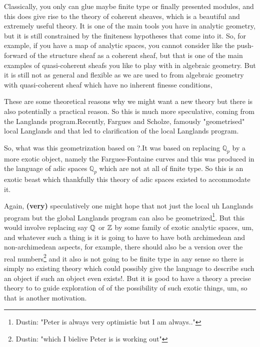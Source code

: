 \begin{remark}
    Classically, you only can glue maybe finite type or finally presented modules, and this does give rise to the theory of 
    coherent sheaves, which is a beautiful and extremely useful theory. It is one of the main tools you have in analytic geometry, 
    but it is still constrained by the finiteness hypotheses that come into it. So, for example, if you have a map of analytic 
    spaces, you cannot consider like the push-forward of the structure sheaf as a coherent sheaf, but that is one of the main 
    examples of quasi-coherent sheafs you like to play with in algebraic geometry. But it is still not as general and flexible 
    as we are used to from algebraic geometry with quasi-coherent sheaf which have no inherent finesse conditions,
\end{remark}

These are some theoretical reasons why we might want a new theory but there is also potentially a practical reason. So this is much 
more speculative, coming from the Langlands program.Recently, Fargues and Scholze, famously "geometrised" local Langlands and that 
led to clarification of the local Langlands program.

So, what was this geometrization based on ?.It was based on replacing $\mathbb{Q}_p$ by a more exotic object, namely the Fargues-Fontaine 
curves and this was produced in the language of adic spaces $\mathbb{Q}_p$ which are not at all of finite type. 
So this is an exotic beast which thankfully this theory of adic spaces existed to accommodate it.

Again, \textbf{(very)} speculatively one might hope that not just the local uh Langlands program but the global Langlands program 
can also be geometrized\footnote{Dustin: "Peter is always very optimistic but I am always.."}. But this would involve replacing say 
$\Bbb{Q}$ or $\Bbb{Z}$ by some family of exotic analytic spaces, um, and whatever such a thing is it is going to have to have both 
archimedean and non-archimedean aspects, for example, there should also be a version over the real 
numbers\footnote{Dustin: "which I bielive Peter is is working out"} and it also is not going to be finite type in any sense so 
there is simply no existing theory which could possibly give the language to describe such an object if such an object even exists!. But it is good to have a theory a precise theory to to guide exploration of of the possibility of such exotic things, um, so that is another motivation.

